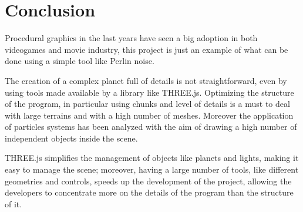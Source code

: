 \documentclass[paper=a4, fontsize=11pt]{scrartcl} %
\numberwithin{equation}{section} %
\numberwithin{figure}{section} %
\numberwithin{table}{section} %
\theoremstyle{definition}
\begin{document}

\section{Conclusion}

Procedural graphics in the last years have seen a big adoption in both videogames
and movie industry, this project is just an example of what can be done using
a simple tool like Perlin noise.

The creation of a complex planet full of details is not straightforward, even
by using tools made available by a library like THREE.js. Optimizing the structure of the program, in particular using chunks and
level of details is a must to deal with large terrains and with a high number
of meshes. Moreover the application of particles systems has been analyzed with the aim of drawing 
a high number of independent objects inside the scene.

THREE.js simplifies the management of objects like planets and lights, making
it easy to manage the scene; moreover, having a large number of tools, like
different geometries and controls, speeds up the development of the project,
allowing the developers to concentrate more on the details of the program
than the structure of it.


\newpage



\end{document}
